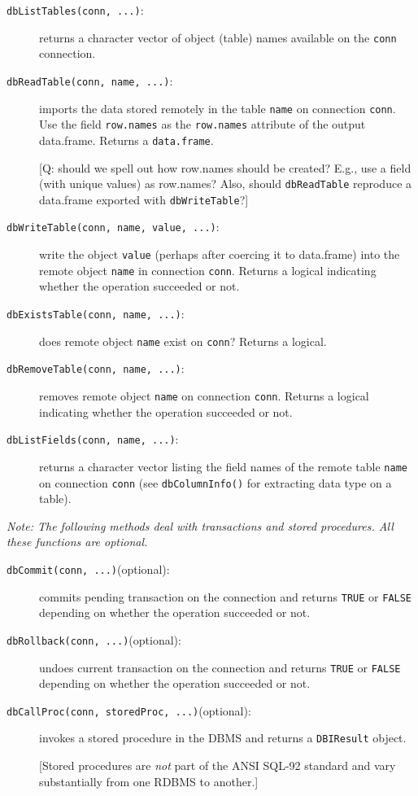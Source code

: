 \documentclass[graphics,times,psfig,dvips,hyper]{article}
\newcommand{\sobj}[1]{\mbox{\tt #1}}    %
\newcommand{\sexp}[1]{\mbox{\tt #1}}    %
\newcommand{\sclass}[1]{\mbox{\tt #1}}  %
\newcommand{\smethod}[1]{\mbox{\tt #1}} %
\begin{document}
\begin{description}
\item[\smethod{dbListTables(conn, ...)}:]
  returns a character vector of object (table) names available on
  the \sobj{conn} connection.

\item[\smethod{dbReadTable(conn, name, ...)}:]
  imports the data stored remotely in the table \sobj{name}
  on connection \sobj{conn}. Use the field \sobj{row.names} 
  as the \sexp{row.names} attribute of the output data.frame.
  Returns a \sclass{data.frame}.

  [Q: should we spell out how row.names should be created? E.g.,
  use a field (with unique values) as row.names?  Also, should
  \smethod{dbReadTable} reproduce a data.frame exported with
  \smethod{dbWriteTable}?]

\item[\smethod{dbWriteTable(conn, name, value, ...)}:]
  write the object \sobj{value} (perhaps after coercing it to 
  data.frame) into the remote object \sobj{name} in connection
  \sobj{conn}.  Returns a logical indicating whether the operation
  succeeded or not.

\item[\smethod{dbExistsTable(conn, name, ...)}:]
  does remote object \sobj{name} exist on \sobj{conn}?
  Returns a logical.

\item[\smethod{dbRemoveTable(conn, name, ...)}:]
  removes remote object \sobj{name} on connection \sobj{conn}.
  Returns a logical indicating whether the operation succeeded or not.

\item[\smethod{dbListFields(conn, name, ...)}:] returns a character vector
listing the field names of the remote table \sobj{name} on connection
\sobj{conn} (see \smethod{dbColumnInfo()} for extracting data type 
on a table).

\end{description}

\emph{Note: The following methods deal with transactions and 
   stored procedures. All these functions are optional.
}
\begin{description}
\item[\smethod{dbCommit(conn, ...)}(optional):]
  commits pending transaction on the connection and returns 
  \sobj{TRUE} or \sobj{FALSE} depending on whether the operation
  succeeded or not.

\item[\smethod{dbRollback(conn, ...)}(optional):]
  undoes current transaction on the connection and returns
  \sobj{TRUE} or \sobj{FALSE} depending on whether the operation
  succeeded or not.

\item[\smethod{dbCallProc(conn, storedProc, ...)}(optional):]
  invokes a stored procedure in the DBMS and returns a \sclass{DBIResult} 
  object.

  [Stored procedures are \emph{not} part of the ANSI SQL-92 standard and
  vary substantially from one RDBMS to another.]

\end{description}
\end{document}
